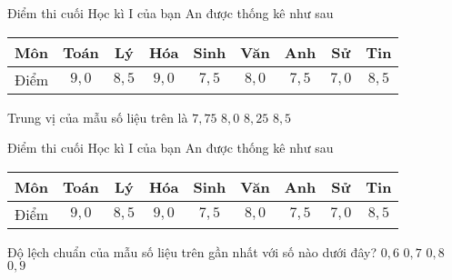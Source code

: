 \begin{ex}%
Điểm thi cuối Học kì I của bạn An được thống kê như sau
\begin{center}
\begin{tabular}{|c|c|c|c|c|c|c|c|c|}
\hline Môn & Toán & Lý & Hóa & Sinh & Văn & Anh & Sử & Tin \\
\hline Điểm & $9{,}0$ & $8{,}5$ & $9{,}0$ & $7{,}5$ & $8{,}0$ & $7{,}5$ & $7{,}0$ & $8{,}5$ \\
\hline
\end{tabular}
\end{center}
Trung vị của mẫu số liệu trên là
		\choice
	{$7{,}75$}
	{$8{,}0$}
	{\True $8{,}25$}
	{$8{,}5$}
\end{ex}

\begin{ex}%
Điểm thi cuối Học kì I của bạn An được thống kê như sau
\begin{center}
\begin{tabular}{|c|c|c|c|c|c|c|c|c|}
\hline Môn & Toán & Lý & Hóa & Sinh & Văn & Anh & Sử & Tin \\
\hline Điểm & $9{,}0$ & $8{,}5$ & $9{,}0$ & $7{,}5$ & $8{,}0$ & $7{,}5$ & $7{,}0$ & $8{,}5$\\
\hline
\end{tabular}
\end{center}
Độ lệch chuẩn của mẫu số liệu trên gần nhất với số nào dưới đây?
		\choice
	{$0{,}6$}
	{\True $0{,}7$}
	{$0{,}8$}
	{$0{,}9$}
\end{ex}

